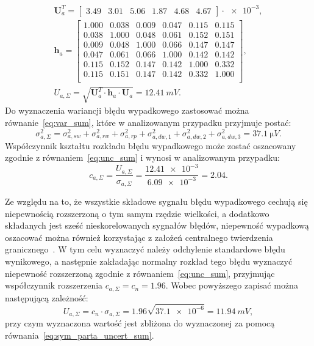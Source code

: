 \begin{gather}
\mathbf{U}_{a}^{T} =
\begin{bmatrix}
3.49 & 3.01 & 5.06 & 1.87 & 4.68 & 4.67
\end{bmatrix} \cdot \num{e-3}
\label{eq:sym_parta_uncert_vector_val}, \\
\mathbf{h}_{a} =
\begin{bmatrix}
1.000 & 0.038 & 0.009 & 0.047 & 0.115 & 0.115 \\
0.038 & 1.000 & 0.048 & 0.061 & 0.152 & 0.151 \\
0.009 & 0.048 & 1.000 & 0.066 & 0.147 & 0.147 \\
0.047 & 0.061 & 0.066 & 1.000 & 0.142 & 0.142 \\
0.115 & 0.152 & 0.147 & 0.142 & 1.000 & 0.332 \\
0.115 & 0.151 & 0.147 & 0.142 & 0.332 & 1.000 \\
\end{bmatrix}
\label{eq:sym_parta_uncert_coher_val}, \\
U_{a,\Sigma} = \sqrt{\mathbf{U}_{a}^{T} \cdot \mathbf{h}_{a} \cdot \mathbf{U}_{a}} = \qty{12.41}{mV} \label{eq:sym_parta_uncert_value_a}.
\end{gather}
Do wyznaczenia wariancji błędu wypadkowego zastosować można równanie~\eqref{eq:var_sum}, które w analizowanym przypadku przyjmuje postać:
\begin{equation}
\sigma_{a,\Sigma}^{2} = \sigma_{a,sw}^{2} + \sigma_{a,rw}^{2} + \sigma_{a,rp}^{2} + \sigma_{a,dw,1}^{2} + \sigma_{a,dw,2}^{2} + \sigma_{a,dw,3}^{2} = \qty{37.1}{\micro V} \label{eq:sym_parta_var_sum}.
\end{equation}
Współczynnik kształtu rozkładu błędu wypadkowego może zostać oszacowany zgodnie z równaniem~\eqref{eq:unc_sum} i wynosi w analizowanym przypadku:
\begin{equation}
c_{a,\Sigma} = \frac{U_{a,\Sigma}}{\sigma_{a,\Sigma}} = \frac{\num{12.41e-3}}{\num{6.09e-3}} = 2.04 \label{eq:sym_parta_uncert_factor}.
\end{equation}

Ze względu na to, że wszystkie składowe sygnału błędu wypadkowego cechują się niepewnością rozszerzoną o tym samym rzędzie wielkości, a dodatkowo składanych jest sześć nieskorelowanych sygnałów błędów, niepewność wypadkową oszacować można również korzystając z założeń centralnego twierdzenia granicznego~\cite{jcgm_guide}. W tym celu wyznaczyć należy odchylenie standardowe błędu wynikowego, a następnie zakładając normalny rozkład tego błędu wyznaczyć niepewność rozszerzoną zgodnie z równaniem~\eqref{eq:unc_sum}, przyjmując współczynnik rozszerzenia $c_{a,\Sigma} = c_{n} = 1.96$. Wobec powyższego zapisać można następującą zależność:
\begin{equation}
U_{a,\Sigma} = c_{n} \cdot \sigma_{a,\Sigma} = 1.96 \sqrt{\num{37.1e-6}} = \qty{11.94}{mV} \label{eq:sym_parta_uncert_value_b},
\end{equation}
przy czym wyznaczona wartość jest zbliżona do wyznaczonej za pomocą równania~\eqref{eq:sym_parta_uncert_sum}.

